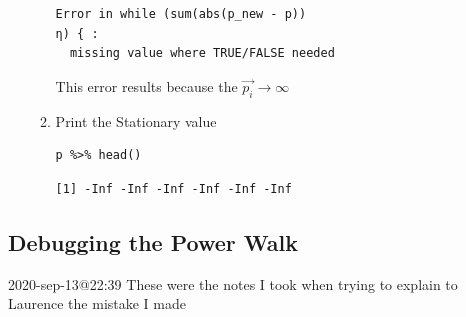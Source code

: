 \documentclass[11pt]{article}
\begin{document}
\begin{enumerate}
\begin{enumerate}
\begin{verbatim}
Error in while (sum(abs(p_new - p))
η) { :
  missing value where TRUE/FALSE needed
\end{verbatim}


This error results because the \(\vec{p_{i}} \rightarrow \infty\)

\item Print the Stationary value
\label{sec:orgb1ff508}
\lstset{language=r,label= ,caption= ,captionpos=b,numbers=none}
\begin{lstlisting}
p %>% head()
\end{lstlisting}

\begin{verbatim}
[1] -Inf -Inf -Inf -Inf -Inf -Inf
\end{verbatim}
\end{enumerate}
\end{enumerate}
\subsection{Debugging the Power Walk}
\label{sec:orgd3f8ba0}
2020-sep-13@22:39
These were the notes I took when trying to explain to Laurence the mistake I made
\end{document}
